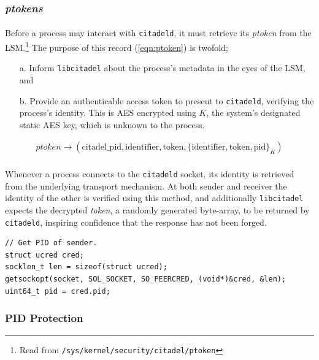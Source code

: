 \subsubsection{\textit{ptokens}}
\label{sec:ptokens}
\paragraph{} Before a process may interact with \texttt{citadeld}, it must retrieve its \textit{ptoken} from the LSM.\footnote{Read from \texttt{/sys/kernel/security/citadel/ptoken}} The purpose of this record (\ref{eqn:ptoken}) is twofold;
\begin{enumerate}
    \item[a.] Inform \texttt{libcitadel} about the process's metadata in the eyes of the LSM, and
    \item[b.] Provide an authenticable access token to present to \texttt{citadeld}, verifying the process's identity. This is AES encrypted using $K$, the system's designated static AES key, which is unknown to the process. 
\end{enumerate}

\vspace{-7mm}
\begin{align}
    \textit{ptoken} \rightarrow ( \text{citadel\_pid}, \text{identifier}, \text{token}, \{\text{identifier}, \text{token}, \text{pid}\}_K) \label{eqn:ptoken}
\end{align}

\paragraph{} Whenever a process connects to the \texttt{citadeld} socket, its identity is retrieved from the underlying transport mechanism. At both sender and receiver the identity of the other is verified using this method, and additionally \texttt{libcitadel} expects the decrypted \textit{token}, a randomly generated byte-array, to be returned by \texttt{citadeld},  inspiring confidence that the response has not been forged.

\begin{verbatim}
// Get PID of sender.
struct ucred cred;
socklen_t len = sizeof(struct ucred);
getsockopt(socket, SOL_SOCKET, SO_PEERCRED, (void*)&cred, &len);
uint64_t pid = cred.pid;
\end{verbatim}

\subsubsection{PID Protection}
